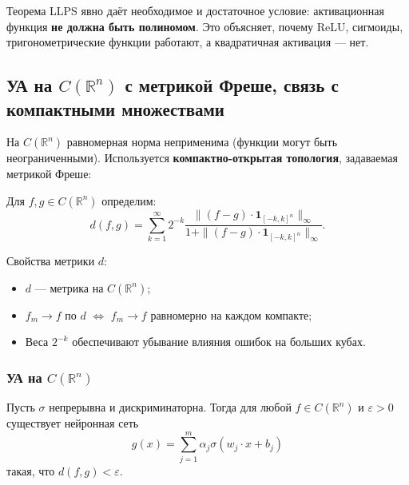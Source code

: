 \documentclass[../NDCNNAI_main.tex]{subfiles}
\begin{document}
\begin{remark}
Теорема LLPS явно даёт необходимое и достаточное условие: активационная функция \textbf{не должна быть полиномом}. Это объясняет, почему ReLU, сигмоиды, тригонометрические функции работают, а квадратичная активация --- нет.
\end{remark}

\subsection{УА на $C(\mathbb{R}^n)$ с метрикой Фреше, связь с компактными множествами}
На $C(\mathbb{R}^n)$ равномерная норма неприменима (функции могут быть неограниченными). Используется \textbf{компактно-открытая топология}, задаваемая метрикой Фреше:

\begin{definition}
Для $f, g \in C(\mathbb{R}^n)$ определим:
\[
d(f, g) = \sum_{k=1}^\infty 2^{-k} \frac{\| (f - g) \cdot \mathbf{1}_{[-k,k]^n} \|_\infty}{1 + \| (f - g) \cdot \mathbf{1}_{[-k,k]^n} \|_\infty}.
\]
\end{definition}

\begin{remark}
Свойства метрики $d$:
\begin{itemize}
    \item $d$ --- метрика на $C(\mathbb{R}^n)$;
    \item $f_m \to f$ по $d$ $\iff$ $f_m \to f$ равномерно на каждом компакте;
    \item Веса $2^{-k}$ обеспечивают убывание влияния ошибок на больших кубах.
\end{itemize}
\end{remark}

\subsubsection*{УА на $C(\mathbb{R}^n)$}

\begin{theorem}
Пусть $\sigma$ непрерывна и дискриминаторна. Тогда для любой $f \in C(\mathbb{R}^n)$ и $\varepsilon > 0$ существует нейронная сеть
\[
g(x) = \sum_{j=1}^m \alpha_j \sigma(w_j \cdot x + b_j)
\]
такая, что $d(f, g) < \varepsilon$.
\end{theorem}
\end{document}
